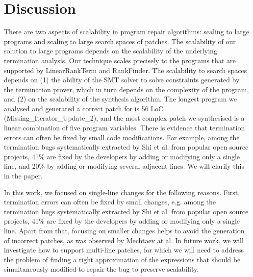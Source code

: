 \section{Discussion}
\label{sec:discussion}

There are two aspects of scalability in program repair algorithms: scaling to large programs and scaling to large search spaces of patches. The scalability of our solution to large programs depends on the scalability of the underlying termination analysis. Our technique scales precisely to the programs that are supported by LinearRankTerm and RankFinder. The scalability to search spaces depends on (1) the ability of the SMT solver to solve constraints generated by the termination prover, which in turn depends on the complexity of the program, and (2) on the scalability of the synthesis algorithm. The longest program we analysed and generated a correct patch for is 56 LoC (Missing\_Iterator\_Update\_2), and the most complex patch we synthesised is a linear combination of five program variables. There is evidence that termination errors can often be fixed by small code modifications. For example, among the termination bugs systematically extracted by Shi et al.  from popular open source projects, 41\% are fixed by the developers by adding or modifying only a single line, and 20\% by adding or modifying several adjacent lines. We will clarify this in the paper. 


In this work, we focused on single-line changes for the following reasons. First, termination errors can often be fixed by small changes, e.g. among the termination bugs systematically extracted by Shi et al. from popular open source projects, 41\% are fixed by the developers by adding or modifying only a single line. Apart from that, focusing on smaller changes helps to avoid the generation of incorrect patches, as was observed by Mechtaev at al. In future work, we will investigate how to support multi-line patches, for which we will need to address the problem of finding a tight approximation of the expressions that should be simultaneously modified to repair the bug to preserve scalability. 
